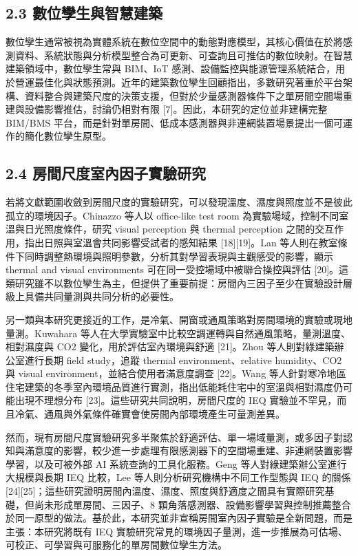 \documentclass[12pt,a4paper]{article}
\begin{document}
\subsection*{2.3 數位孿生與智慧建築}

數位孿生通常被視為實體系統在數位空間中的動態對應模型，其核心價值在於將感測資料、系統狀態與分析模型整合為可更新、可查詢且可推估的數位映射。在智慧建築領域中，數位孿生常與 BIM、IoT 感測、設備監控與能源管理系統結合，用於營運最佳化與狀態預測。近年的建築數位孿生回顧指出，多數研究著重於平台架構、資料整合與建築尺度的決策支援，但對於少量感測器條件下之單房間空間場重建與設備影響推估，討論仍相對有限 [7]。因此，本研究的定位並非建構完整 BIM/BMS 平台，而是針對單房間、低成本感測器與非連網裝置場景提出一個可運作的簡化數位孿生原型。


\subsection*{2.4 房間尺度室內因子實驗研究}

若將文獻範圍收斂到房間尺度的實驗研究，可以發現溫度、濕度與照度並不是彼此孤立的環境因子。Chinazzo 等人以 office-like test room 為實驗場域，控制不同室溫與日光照度條件，研究 visual perception 與 thermal perception 之間的交互作用，指出日照與室溫會共同影響受試者的感知結果 [18][19]。Lan 等人則在教室條件下同時調整熱環境與照明參數，分析其對學習表現與主觀感受的影響，顯示 thermal and visual environments 可在同一受控場域中被聯合操控與評估 [20]。這類研究雖不以數位孿生為主，但提供了重要前提：房間內三因子至少在實驗設計層級上具備共同量測與共同分析的必要性。


另一類與本研究更接近的工作，是冷氣、開窗或通風策略對房間環境的實驗或現地量測。Kuwahara 等人在大學實驗室中比較空調運轉與自然通風策略，量測溫度、相對濕度與 CO2 變化，用於評估室內環境與舒適 [21]。Zhou 等人則對綠建築辦公室進行長期 field study，追蹤 thermal environment、relative humidity、CO2 與 visual environment，並結合使用者滿意度調查 [22]。Wang 等人針對寒冷地區住宅建築的冬季室內環境品質進行實測，指出低能耗住宅中的室溫與相對濕度仍可能出現不理想分布 [23]。這些研究共同說明，房間尺度的 IEQ 實驗並不罕見，而且冷氣、通風與外氣條件確實會使房間內部環境產生可量測差異。


然而，現有房間尺度實驗研究多半聚焦於舒適評估、單一場域量測，或多因子對認知與滿意度的影響，較少進一步處理有限感測器下的空間場重建、非連網裝置影響學習，以及可被外部 AI 系統查詢的工具化服務。Geng 等人對綠建築辦公室進行大規模與長期 IEQ 比較，Lee 等人則分析研究機構中不同工作型態與 IEQ 的關係 [24][25]；這些研究證明房間內溫度、濕度、照度與舒適度之間具有實際研究基礎，但尚未形成單房間、三因子、8 顆角落感測器、設備影響學習與控制推薦整合於同一原型的做法。基於此，本研究並非宣稱房間室內因子實驗是全新問題，而是主張：本研究將既有 IEQ 實驗研究常見的環境因子量測，進一步推展為可估場、可校正、可學習與可服務化的單房間數位孿生方法。
\end{document}
